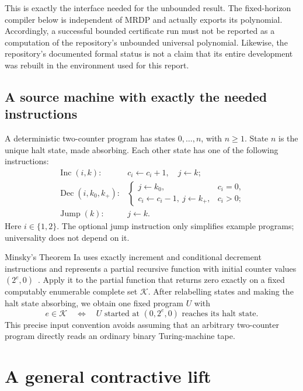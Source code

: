 \documentclass[11pt,letterpaper]{article}
\numberwithin{equation}{section}
\theoremstyle{definition}
\theoremstyle{remark}
\newcommand{\srcmark}[1]{\par\noindent{\small\itshape [source~#1]}\par}
\begin{document}
This is exactly the interface needed for the unbounded result. The
fixed-horizon compiler below is independent of MRDP and actually exports its
polynomial. Accordingly, a successful bounded certificate run must not be
reported as a computation of the repository's unbounded universal polynomial.
Likewise, the repository's documented formal status is not a claim that its
entire development was rebuilt in the environment used for this report.

\subsection{A source machine with exactly the needed instructions}

A deterministic two-counter program has states $0,\ldots,n$, with $n\ge1$.
State $n$ is the unique halt state, made absorbing. Each other state has one
of the following instructions:
\[
\begin{array}{ll}
\operatorname{Inc}(i,k): & c_i\leftarrow c_i+1,\quad j\leftarrow k;\\
\operatorname{Dec}(i,k_0,k_+): &
\begin{cases}
 j\leftarrow k_0,&c_i=0,\\
 c_i\leftarrow c_i-1,\ j\leftarrow k_+,&c_i>0;
\end{cases}\\
\operatorname{Jump}(k):&j\leftarrow k.
\end{array}
\]
Here $i\in\{1,2\}$. The optional jump instruction only simplifies example
programs; universality does not depend on it.

Minsky's Theorem Ia uses exactly increment and conditional decrement
instructions and represents a partial recursive function with initial
counter values $(2^e,0)$~\cite[Theorem Ia, p.~449]{b62s14-minsky}.
Apply it to the partial function that returns zero exactly on a fixed
computably enumerable complete set $\mathcal K$. After relabelling states
and making the halt state absorbing, we obtain one fixed program $U$ with
\begin{equation}\label{pqc:sc:eq:universal}
 e\in\mathcal K\quad\Longleftrightarrow\quad
 U\text{ started at }(0,2^e,0)\text{ reaches its halt state}.
\end{equation}
This precise input convention avoids assuming that an arbitrary two-counter
program directly reads an ordinary binary Turing-machine tape.

\section{A general contractive lift}\label{pqc:sc:sec:general-lift}
\srcmark{14}
\end{document}
